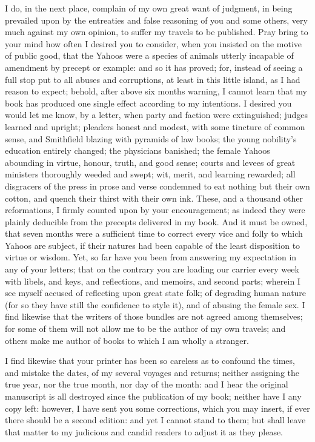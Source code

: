 I do, in the next place, complain of my own great want of judgment, in being prevailed upon by the entreaties and false reasoning of you and some others, very much against my own opinion, to suffer my travels to be published.  Pray bring to your mind how often I desired you to consider, when you insisted on the motive of public good, that the Yahoos were a species of animals utterly incapable of amendment by precept or example: and so it has proved; for, instead of seeing a full stop put to all abuses and corruptions, at least in this little island, as I had reason to expect; behold, after above six months warning, I cannot learn that my book has produced one single effect according to my intentions.  I desired you would let me know, by a letter, when party and faction were extinguished; judges learned and upright; pleaders honest and modest, with some tincture of common sense, and Smithfield blazing with pyramids of law books; the young nobility’s education entirely changed; the physicians banished; the female Yahoos abounding in virtue, honour, truth, and good sense; courts and levees of great ministers thoroughly weeded and swept; wit, merit, and learning rewarded; all disgracers of the press in prose and verse condemned to eat nothing but their own cotton, and quench their thirst with their own ink.  These, and a thousand other reformations, I firmly counted upon by your encouragement; as indeed they were plainly deducible from the precepts delivered in my book.  And it must be owned, that seven months were a sufficient time to correct every vice and folly to which Yahoos are subject, if their natures had been capable of the least disposition to virtue or wisdom.  Yet, so far have you been from answering my expectation in any of your letters; that on the contrary you are loading our carrier every week with libels, and keys, and reflections, and memoirs, and second parts; wherein I see myself accused of reflecting upon great state folk; of degrading human nature (for so they have still the confidence to style it), and of abusing the female sex.  I find likewise that the writers of those bundles are not agreed among themselves; for some of them will not allow me to be the author of my own travels; and others make me author of books to which I am wholly a stranger.

I find likewise that your printer has been so careless as to confound the times, and mistake the dates, of my several voyages and returns; neither assigning the true year, nor the true month, nor day of the month: and I hear the original manuscript is all destroyed since the publication of my book; neither have I any copy left: however, I have sent you some corrections, which you may insert, if ever there should be a second edition: and yet I cannot stand to them; but shall leave that matter to my judicious and candid readers to adjust it as they please.

